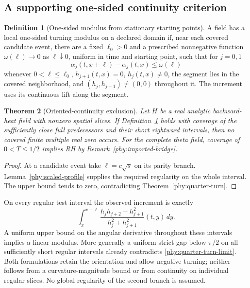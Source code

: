 \documentclass[11pt]{article}
\numberwithin{equation}{section}
\newtheorem{theorem}{Theorem}[section]
\theoremstyle{definition}
\newtheorem{definition}[theorem]{Definition}
\theoremstyle{remark}
\begin{document}
\subsection{A supporting one-sided continuity criterion}

\begin{definition}[One-sided modulus from stationary starting points]
\label{phy:turning-modulus}
A field has a local one-sided turning modulus on a declared domain if,
near each covered candidate event, there are a fixed $\ell_0>0$ and a
prescribed nonnegative function $\omega(\ell)\to0$ as $\ell\downarrow0$,
uniform in time and starting point, such that for $j=0,1$
\begin{equation}
 \alpha_j(t,x+\ell)-\alpha_j(t,x)\le\omega(\ell)
 \label{phy:modulus-condition}
\end{equation}
whenever $0<\ell\le\ell_0$, $h_{j+1}(t,x)=0$, $h_j(t,x)\ne0$,
the segment lies in the covered neighborhood, and
$(h_j,h_{j+1})\ne(0,0)$ throughout it.  The increment uses its
continuous lift along the segment.
\end{definition}

\begin{theorem}[Oriented-continuity exclusion]
\label{phy:turning-exclusion}
Let $H$ be a real analytic backward-heat field with nonzero spatial
slices.  If Definition~\ref{phy:turning-modulus} holds with coverage of
the sufficiently close full predecessors and their short rightward
intervals, then no covered finite multiple real zero occurs.
For the complete theta field, coverage of $0<T\le1/2$ implies RH by
Remark~\ref{phy:imported-bridge}.
\end{theorem}
\begin{proof}
At a candidate event take $\ell=c\sqrt{s}$ on its parity branch.
Lemma~\ref{phy:scaled-profile} supplies the required regularity on the
whole interval.  The upper bound tends to zero, contradicting
Theorem~\ref{phy:quarter-turn}.
\end{proof}

On every regular test interval the observed increment is exactly
\begin{equation}
 \int_x^{x+\ell}
 \frac{h_jh_{j+2}-h_{j+1}^2}{h_j^2+h_{j+1}^2}(t,y)\,dy.
 \label{phy:signed-turning-integral}
\end{equation}
A uniform upper bound on the angular derivative throughout these
intervals implies a linear modulus.  More generally a uniform strict
gap below $\pi/2$ on all sufficiently short regular intervals already
contradicts \eqref{phy:quarter-turn-limit}.  Both formulations retain
the orientation and allow negative turning; neither follows from a
curvature-magnitude bound or from continuity on individual regular
slices.  No global regularity of the second branch is assumed.
\end{document}
